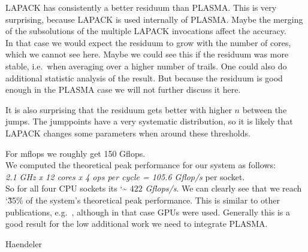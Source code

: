 \documentclass[a4paper,final,ngerman,english]{article}
\begin{document}
LAPACK has consistently a better residuum than PLASMA.\@
This is very surprising, because LAPACK is used internally of PLASMA.\@
Maybe the merging of the subsolutions of the multiple LAPACK invocations affect the accuracy.\\
In that case we would expect the residuum to grow with the number of cores, which we cannot see here.
Maybe we could see this if the residuum was more stable, i.e.\ when averaging over a higher number of trails.
One could also do additional statistic analysis of the result.
But because the residuum is good enough in the PLASMA case we will not further discuss it here.

It is also surprising that the residuum gets better with higher $n$ between the jumps.
The jumppoints have a very systematic distribution, so it is likely that
LAPACK changes some parameters when around these thresholds.

For mflops we roughly get 150 Gflops.\\
We computed the theoretical peak performance for our system as follows:\\
\textit{2.1 GHz x 12 cores x 4 ops per cycle = 105.6 Gflop/s} per socket.~\cite{lawn266} \\
So for all four CPU sockets its \char`\~ $422$ \textit{Gflops/s}.
We can clearly see that we reach \char`\~ 35\% of the system's theoretical peak performance.
This is similar to other publications, e.g.~\cite{lawn266},
although in that case GPUs were used.
Generally this is a good result for the low additional work we need to integrate PLASMA.
\begin{flushright} Haendeler \end{flushright} 
%
\ \\
\ \\
\begin{footnotesize}
\end{footnotesize}
\end{document}
